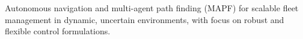 Autonomous navigation and multi-agent path finding (MAPF) for scalable fleet management in dynamic, uncertain environments, with focus on robust and flexible control formulations.